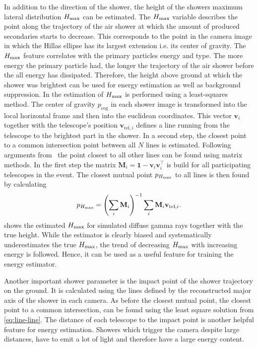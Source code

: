 In addition to the direction of the shower, the height of the showers maximum lateral distribution $H_\text{max}$ can be estimated.
The $H_\text{max}$ variable describes the point along the trajectory of the air shower at which the amount of produced secondaries starts to decrease.
This corresponds to the point in the camera image in which the Hillas ellipse has its largest extension i.e. its center of gravity.
The $H_\text{max}$ feature correlates with the primary particles energy and type. The more energy the primary particle had, the longer the trajectory of the air shower 
before the all energy has dissipated. 
Therefore, the height above ground at which the shower was brightest can be used for energy estimation as well as background suppression. 
In \ctapipe the estimation of $H_\text{max}$ is performed using a least-squares method.
The center of gravity $p_{\text{cog}}$ in each shower image is transformed into the local horizontal frame and then into the euclidean coordinates.
This vector $\mathbf{v}_i$ together with the telescope's position $\mathbf{v}_{\text{tel}, i}$ defines a line running from the telescope to the brightest part in the shower. 
In a second step, the closest point to a common intersection point between all $N$ lines is estimated.
Following arguments from~\cite{line_line} the point closest to all other lines can be found using matrix methods. In the first step the matrix 
$\mathbf{M}_i = \mathbf{1} - \mathbf{v}_i \mathbf{v}_i^\top$ is build for all participating telescopes in the event. 
The closest mutual point $p_{H_\text{max}}$ to all lines is then found by calculating
\begin{equation}
    \label{eq:line-line}
    p_{\hmax} = \left(\sum_i \mathbf{M}_i \right)^{-1}  \sum_i \mathbf{M}_i \mathbf{v}_{\text{tel}, i}.
\end{equation}
 shows the estimated $H_\text{max}$ for simulated diffuse gamma rays together with the true height.
While the estimator is clearly biased and systematically underestimates the true $H_\text{max}$,
the trend of decreasing $H_\text{max}$ with increasing energy is followed. Hence, it can be used as a useful feature for training the energy estimator.

Another important shower parameter is the impact point of the shower trajectory on the ground. It is calculated using the lines defined 
by the reconstructed major axis of the shower in each camera. As before the closest mutual point, the closest point to a common intersection, can be found using the 
least square solution from \cref{eq:line-line}. The distance of each telescope to the impact point is another helpful feature for energy estimation. 
Showers which trigger the camera despite large distances, have to emit a lot of light and therefore have a large energy content. 


